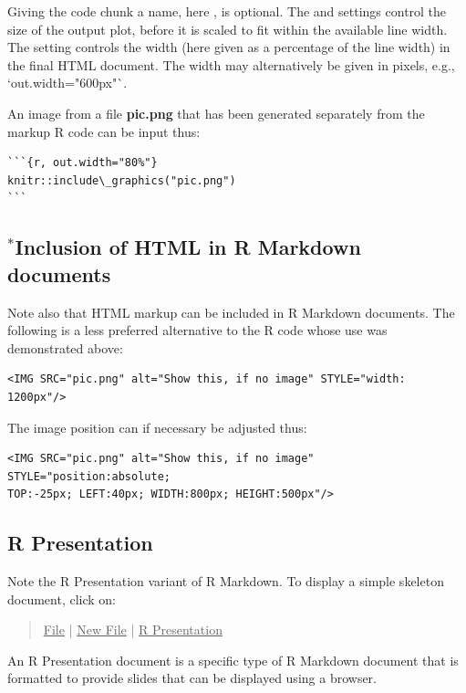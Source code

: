 Giving the code chunk a name, here , is optional.
 The  and  settings
  control the size of the output plot, before it is scaled to fit
  within the available line width.  The  setting
  controls the width (here given as a percentage of the line
  width) in the final HTML document.  The width may alternatively
  be given in pixels, e.g., `out.width="600px"`.
  
An image from a file {\bf pic.png} that has been generated
separately from the markup R code can be input thus:

\begin{minipage}[t]{1.05\textwidth}
\begin{verbatim}
```{r, out.width="80%"}
knitr::include\_graphics("pic.png")
```
\end{verbatim}
\end{minipage}
  
\subsection*{$^*$Inclusion of HTML in R Markdown documents}
Note also that HTML markup can be included in R Markdown documents.
The following is a less preferred alternative to the
R code  whose use was
demonstrated above:
\begin{verbatim}
<IMG SRC="pic.png" alt="Show this, if no image" STYLE="width: 1200px"/>
\end{verbatim}

The image position can if necessary be adjusted thus:
\begin{verbatim}
<IMG SRC="pic.png" alt="Show this, if no image" STYLE="position:absolute;
TOP:-25px; LEFT:40px; WIDTH:800px; HEIGHT:500px"/>
\end{verbatim}

\subsection*{R Presentation}

Note the R Presentation variant of R Markdown.
To display a simple skeleton  document, click on:
\begin{quote}
\underline{File} | \underline{New File} | \underline{R Presentation}
\end{quote}
An R Presentation document is a specific type of R Markdown document
that is formatted to provide slides that can be displayed using a
browser.


